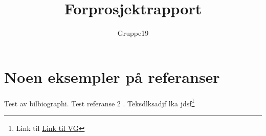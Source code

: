 \documentclass[11pt,a4paper,titlepage]{report}
\author{Gruppe19}
\title{Forprosjektrapport}
\begin{document}
\maketitle
\tableofcontents

\newcommand{\mw}{\emph{Making Waves}}
\newcommand{\es}{\emph{Elasticsearch}}
\newcommand{\csh}{C\nolinebreak\hspace{-.05em}\raisebox{.6ex}{\scriptsize\bf \#}}








\chapter{Noen eksempler på referanser}
Test av bilbiographi\cite{book:unixprog}.
Test referanse 2 \cite{book:unixprog2}.
Teksdlksadjf lka jdsf\footnote{Link til \href{www.vg.no}{Link til VG}}




	
\end{document}
